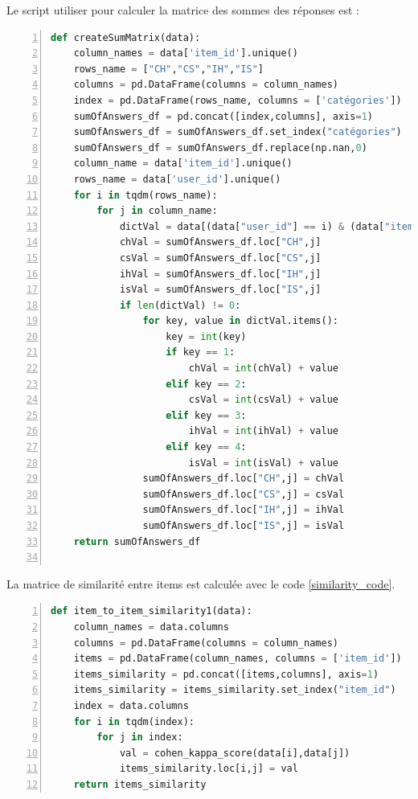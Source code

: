 Le script utiliser pour calculer la matrice des sommes des réponses est :
\begin{lstlisting}[language=Python,basicstyle=\scriptsize, frame=l,framesep=4.5mm,framexleftmargin=2.5mm,tabsize=2,numbers=left,fillcolor=\color{blueforest!70},rulecolor=\color{blueforest},numberstyle=\normalfont\tiny\color{white}]
	def createSumMatrix(data):
    column_names = data['item_id'].unique()
    rows_name = ["CH","CS","IH","IS"]
    columns = pd.DataFrame(columns = column_names)
    index = pd.DataFrame(rows_name, columns = ['catégories'])
    sumOfAnswers_df = pd.concat([index,columns], axis=1)
    sumOfAnswers_df = sumOfAnswers_df.set_index("catégories")
    sumOfAnswers_df = sumOfAnswers_df.replace(np.nan,0)
    column_name = data['item_id'].unique()
    rows_name = data['user_id'].unique()
    for i in tqdm(rows_name):
        for j in column_name:
            dictVal = data[(data["user_id"] == i) & (data["item_id"] == j)]['answers_using_hint'].value_counts()
            chVal = sumOfAnswers_df.loc["CH",j]
            csVal = sumOfAnswers_df.loc["CS",j]
            ihVal = sumOfAnswers_df.loc["IH",j]
            isVal = sumOfAnswers_df.loc["IS",j]
            if len(dictVal) != 0:
                for key, value in dictVal.items():
                    key = int(key)
                    if key == 1:
                        chVal = int(chVal) + value
                    elif key == 2:
                        csVal = int(csVal) + value
                    elif key == 3:
                        ihVal = int(ihVal) + value
                    elif key == 4:
                        isVal = int(isVal) + value
                sumOfAnswers_df.loc["CH",j] = chVal
                sumOfAnswers_df.loc["CS",j] = csVal
                sumOfAnswers_df.loc["IH",j] = ihVal
                sumOfAnswers_df.loc["IS",j] = isVal
	return sumOfAnswers_df
	
\end{lstlisting}

La matrice de similarité entre items est calculée avec le code \ref{similarity_code}.
\begin{lstlisting}[language=Python,label={similarity_code}, basicstyle=\scriptsize, frame=l,framesep=4.5mm,framexleftmargin=2.5mm,tabsize=2,numbers=left,fillcolor=\color{blueforest!70},rulecolor=\color{blueforest},numberstyle=\normalfont\tiny\color{white}]
	def item_to_item_similarity1(data):
    column_names = data.columns
    columns = pd.DataFrame(columns = column_names)
    items = pd.DataFrame(column_names, columns = ['item_id'])
    items_similarity = pd.concat([items,columns], axis=1)
    items_similarity = items_similarity.set_index("item_id")
    index = data.columns
    for i in tqdm(index):
        for j in index:
            val = cohen_kappa_score(data[i],data[j])
            items_similarity.loc[i,j] = val
    return items_similarity
\end{lstlisting}

